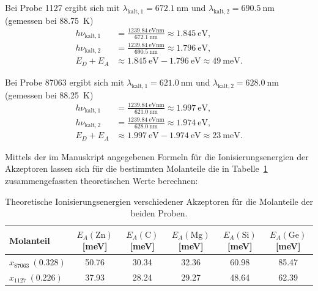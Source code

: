 \documentclass{article}
\begin{document}
Bei Probe 1127 ergibt sich mit $\lambda_\mathrm{kalt,1}=\SI{672.1}{\nano\meter}$ und
$\lambda_\mathrm{kalt,2}=\SI{690.5}{\nano\meter}$ (gemessen bei \SI{88.75}{\kelvin})
\begin{align}
    h\nu_\mathrm{kalt,1} &= \frac{\SI{1239.84}{\electronvolt\nano\meter}}{\SI{672.1}{\nano\meter}}
    \approx \SI{1.845}{\electronvolt},\\
    h\nu_\mathrm{kalt,2} &= \frac{\SI{1239.84}{\electronvolt\nano\meter}}{\SI{690.5}{\nano\meter}}
    \approx \SI{1.796}{\electronvolt},\\
    E_D+E_A &\approx \SI{1.845}{\electronvolt}-\SI{1.796}{\electronvolt}
    \approx \SI{49}{\milli\electronvolt}.
\end{align}

Bei Probe 87063 ergibt sich mit $\lambda_\mathrm{kalt,1}=\SI{621.0}{\nano\meter}$ und
$\lambda_\mathrm{kalt,2}=\SI{628.0}{\nano\meter}$ (gemessen bei \SI{88.25}{\kelvin})
\begin{align}
    h\nu_\mathrm{kalt,1} &= \frac{\SI{1239.84}{\electronvolt\nano\meter}}{\SI{621.0}{\nano\meter}}
    \approx \SI{1.997}{\electronvolt},\\
    h\nu_\mathrm{kalt,2} &= \frac{\SI{1239.84}{\electronvolt\nano\meter}}{\SI{628.0}{\nano\meter}}
    \approx \SI{1.974}{\electronvolt},\\
    E_D+E_A &\approx \SI{1.997}{\electronvolt}-\SI{1.974}{\electronvolt}
    \approx \SI{23}{\milli\electronvolt}.
\end{align}

Mittels der im Manuskript angegebenen Formeln für die Ionisierungsenergien der Akzeptoren lassen sich
für die bestimmten Molanteile die in Tabelle~\ref{tab:ionisierung} zusammengefassten theoretischen
Werte berechnen:

\begin{table}[H]
\centering
\caption{Theoretische Ionisierungsenergien verschiedener Akzeptoren für die Molanteile der beiden Proben.}
\label{tab:ionisierung}
\begin{tabular}{lccccc}
\toprule
Molanteil & $E_A(\mathrm{Zn})$ [meV] & $E_A(\mathrm{C})$ [meV] & $E_A(\mathrm{Mg})$ [meV] & $E_A(\mathrm{Si})$ [meV] & $E_A(\mathrm{Ge})$ [meV]\\
\midrule
$x_{87063}\ (0.328)$ & 50.76 & 30.34 & 32.36 & 60.98 & 85.47\\
$x_{1127}\ (0.226)$ & 37.93 & 28.24 & 29.27 & 48.64 & 62.39\\
\bottomrule
\end{tabular}
\end{table}
\end{document}
